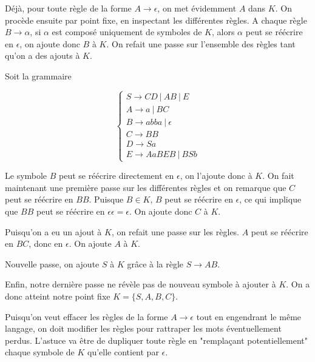 Déjà, pour toute règle de la forme $A \rightarrow \epsilon$, on met évidemment $A$ dans $K$. On procède ensuite par point fixe, en inspectant les différentes règles. A chaque règle $B \rightarrow \alpha$, si $\alpha$ est composé uniquement de symboles de $K$, alors $\alpha$ peut se réécrire en $\epsilon$, on ajoute donc $B$ à $K$. On refait une passe sur l'ensemble des règles tant qu'on a des ajouts à $K$.

\begin{example}
\label{gramelimeps1}
Soit la grammaire 

\[
\begin{cases}
S \rightarrow CD~|~AB~|~E \\
A \rightarrow a~|~BC \\
B \rightarrow abba~|~\epsilon \\
C \rightarrow BB \\
D \rightarrow Sa \\
E \rightarrow AaBEB~|~BSb
\end{cases}
\]

Le symbole $B$ peut se réécrire directement en $\epsilon$, on l'ajoute donc à $K$. On fait maintenant une première passe sur les différentes règles et on remarque que $C$ peut se réécrire en $BB$. Puisque $B \in K$, $B$ peut se réécrire en $\epsilon$, ce qui implique que $BB$ peut se réécrire en $\epsilon \epsilon = \epsilon$. On ajoute donc $C$ à $K$.

Puisqu'on a eu un ajout à $K$, on refait une passe sur les règles. $A$ peut se réécrire en $BC$, donc en $\epsilon$. On ajoute $A$ à $K$.

Nouvelle passe, on ajoute $S$ à $K$ grâce à la règle $S \rightarrow AB$. 

Enfin, notre dernière passe ne révèle pas de nouveau symbole à ajouter à $K$. On a donc atteint notre point fixe $K = \{S,A,B,C\}$.
\end{example}

Puisqu'on veut effacer les règles de la forme $A \rightarrow \epsilon$ tout en engendrant le même langage, on doit modifier les règles pour rattraper les mots éventuellement perdus. L'astuce va être de dupliquer toute règle  en "remplaçant potentiellement" chaque symbole de $K$ qu'elle contient par $\epsilon$.

